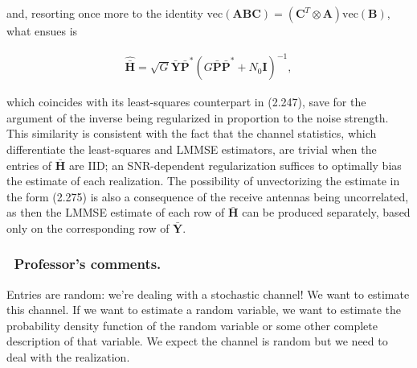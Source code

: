 \documentclass[a4paper, 12pt]{book}
\begin{document}
and, resorting once more to the identity $\text{vec}(\boldsymbol{A}\boldsymbol{B}\boldsymbol{C}) = (\boldsymbol{C}^T \otimes \boldsymbol{A}) \text{vec}(\boldsymbol{B})$, what ensues is

\begin{align}
\hat{\bar{\boldsymbol{H}}} = \sqrt{G} \bar{\boldsymbol{Y}} \bar{\boldsymbol{P}}^* (G \bar{\boldsymbol{P}} \bar{\boldsymbol{P}}^* + N_0 \boldsymbol{I})^{-1}, \tag{2.275}
\end{align}

which coincides with its least-squares counterpart in (2.247), save for the argument of the inverse being regularized in proportion to the noise strength. This similarity is consistent with the fact that the channel statistics, which differentiate the least-squares and LMMSE estimators, are trivial when the entries of $\bar{\boldsymbol{H}}$ are IID; an SNR-dependent regularization suffices to optimally bias the estimate of each realization. The possibility of unvectorizing the estimate in the form (2.275) is also a consequence of the receive antennas being uncorrelated, as then the LMMSE estimate of each row of $\bar{\boldsymbol{H}}$ can be produced separately, based only on the corresponding row of $\bar{\boldsymbol{Y}}$.

\subsubsection*{\faItalic\ Professor's comments.}
Entries are random: we're dealing with a stochastic channel! We want to estimate this channel.
If we want to estimate a random variable, we want to estimate the probability density function of the random variable or some other complete description of that variable.
We expect the channel is random but we need to deal with the realization.

\vspace{0.5cm}

\noindent\colorbox{white}{%
    \setlength{\fboxrule}{1.5pt}%
    \setlength{\fboxsep}{10pt}%
}
\end{document}
